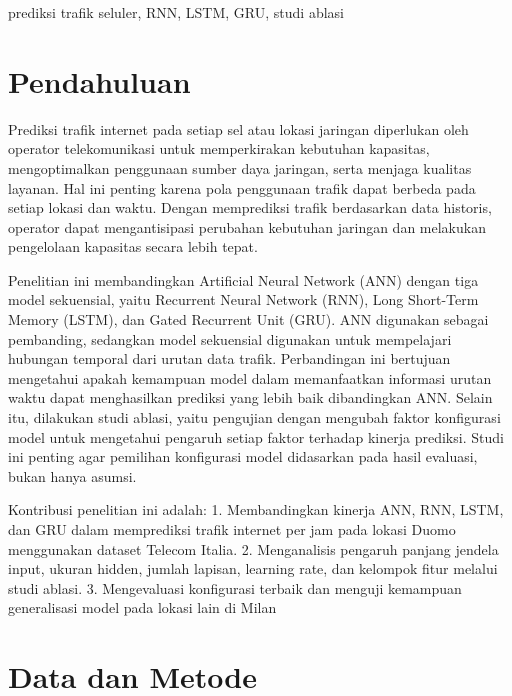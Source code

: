 \documentclass[conference,a4paper]{IEEEtran}
\begin{document}
\begin{IEEEkeywords}
prediksi trafik seluler, RNN, LSTM, GRU, studi ablasi
\end{IEEEkeywords}

\section{Pendahuluan}
Prediksi trafik internet pada setiap sel atau lokasi jaringan diperlukan oleh operator telekomunikasi untuk memperkirakan kebutuhan kapasitas, mengoptimalkan penggunaan sumber daya jaringan, serta menjaga kualitas layanan. Hal ini penting karena pola penggunaan trafik dapat berbeda pada setiap lokasi dan waktu. Dengan memprediksi trafik berdasarkan data historis, operator dapat mengantisipasi perubahan kebutuhan jaringan dan melakukan pengelolaan kapasitas secara lebih tepat.

Penelitian ini membandingkan Artificial Neural Network (ANN) dengan tiga model sekuensial, yaitu Recurrent Neural Network (RNN), Long Short-Term Memory (LSTM), dan Gated Recurrent Unit (GRU). ANN digunakan sebagai pembanding, sedangkan model sekuensial digunakan untuk mempelajari hubungan temporal dari urutan data trafik. Perbandingan ini bertujuan mengetahui apakah kemampuan model dalam memanfaatkan informasi urutan waktu dapat menghasilkan prediksi yang lebih baik dibandingkan ANN. Selain itu, dilakukan studi ablasi, yaitu pengujian dengan mengubah faktor konfigurasi model untuk mengetahui pengaruh setiap faktor terhadap kinerja prediksi. Studi ini penting agar pemilihan konfigurasi model didasarkan pada hasil evaluasi, bukan hanya asumsi.

Kontribusi penelitian ini adalah:
1. Membandingkan kinerja ANN, RNN, LSTM, dan GRU dalam memprediksi trafik internet per jam pada lokasi Duomo menggunakan dataset Telecom Italia.
2. Menganalisis pengaruh panjang jendela input, ukuran hidden, jumlah lapisan, learning rate, dan kelompok fitur melalui studi ablasi.
3. Mengevaluasi konfigurasi terbaik dan menguji kemampuan generalisasi model pada lokasi lain di Milan

\section{Data dan Metode}
\end{document}
